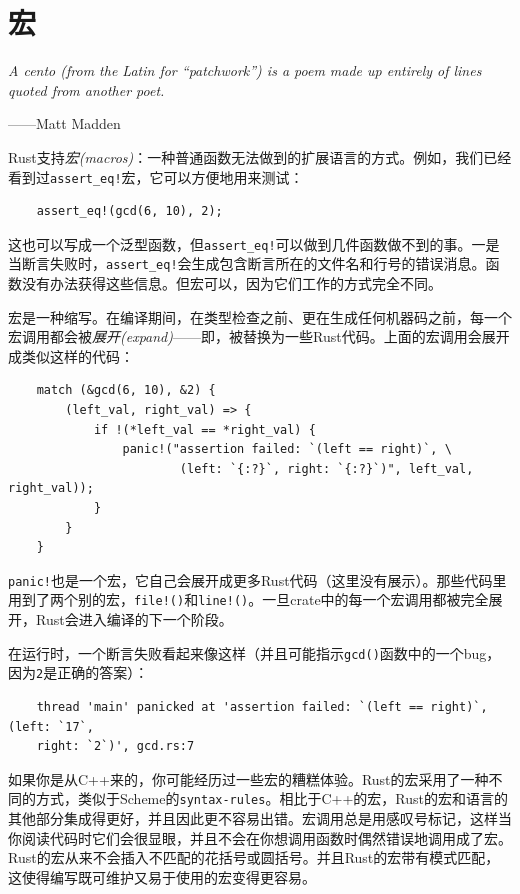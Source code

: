 \chapter{宏}\label{ch21}

\emph{A cento (from the Latin for “patchwork”) is a poem made up entirely of lines quoted from another poet.}
\begin{flushright}
    ——Matt Madden
\end{flushright}

Rust支持\emph{宏(macros)}：一种普通函数无法做到的扩展语言的方式。例如，我们已经看到过\texttt{assert\_eq!}宏，它可以方便地用来测试：
\begin{verbatim}
    assert_eq!(gcd(6, 10), 2);
\end{verbatim}

这也可以写成一个泛型函数，但\texttt{assert\_eq!}可以做到几件函数做不到的事。一是当断言失败时，\texttt{assert\_eq!}会生成包含断言所在的文件名和行号的错误消息。函数没有办法获得这些信息。但宏可以，因为它们工作的方式完全不同。

宏是一种缩写。在编译期间，在类型检查之前、更在生成任何机器码之前，每一个宏调用都会被\emph{展开(expand)}——即，被替换为一些Rust代码。上面的宏调用会展开成类似这样的代码：
\begin{verbatim}
    match (&gcd(6, 10), &2) {
        (left_val, right_val) => {
            if !(*left_val == *right_val) {
                panic!("assertion failed: `(left == right)`, \
                        (left: `{:?}`, right: `{:?}`)", left_val, right_val));
            }
        }
    }
\end{verbatim}

\texttt{panic!}也是一个宏，它自己会展开成更多Rust代码（这里没有展示）。那些代码里用到了两个别的宏，\texttt{file!()}和\texttt{line!()}。一旦crate中的每一个宏调用都被完全展开，Rust会进入编译的下一个阶段。

在运行时，一个断言失败看起来像这样（并且可能指示\texttt{gcd()}函数中的一个bug，因为\texttt{2}是正确的答案）：
\begin{verbatim}
    thread 'main' panicked at 'assertion failed: `(left == right)`, (left: `17`,
    right: `2`)', gcd.rs:7
\end{verbatim}

如果你是从C++来的，你可能经历过一些宏的糟糕体验。Rust的宏采用了一种不同的方式，类似于Scheme的\texttt{syntax-rules}。相比于C++的宏，Rust的宏和语言的其他部分集成得更好，并且因此更不容易出错。宏调用总是用感叹号标记，这样当你阅读代码时它们会很显眼，并且不会在你想调用函数时偶然错误地调用成了宏。Rust的宏从来不会插入不匹配的花括号或圆括号。并且Rust的宏带有模式匹配，这使得编写既可维护又易于使用的宏变得更容易。

